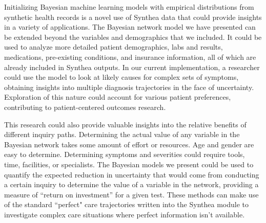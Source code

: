 \documentclass[11pt]{article}
\begin{document}
Initializing Bayesian machine learning models with empirical distributions from synthetic health records is a novel use of Synthea data that could provide insights in a variety of applications.  The Bayesian network model we have presented can be extended beyond the variables and demographics that we included.  It could be used to analyze more detailed patient demographics, labs and results, medications, pre-existing conditions, and insurance information, all of which are already included in Synthea outputs.  In our current implementation, a researcher could use the model to look at likely causes for complex sets of symptoms, obtaining insights into multiple diagnosis trajectories in the face of uncertainty.  Exploration of this nature could account for various patient preferences, contributing to patient-centered outcomes research.  

This research could also provide valuable insights into the relative benefits of different inquiry paths.  Determining the actual value of any variable in the Bayesian network takes some amount of effort or resources.  Age and gender are easy to determine.  Determining symptoms and severities could require tools, time, facilities, or specialists.  The Bayesian models we present could be used to quantify the expected reduction in uncertainty that would come from conducting a certain inquiry to determine the value of a variable in the network, providing a measure of ``return on investment'' for a given test.  These methods can make use of the standard ``perfect" care trajectories written into the Synthea module to investigate complex care situations where perfect information isn't available.  

\clearpage






\end{document}
